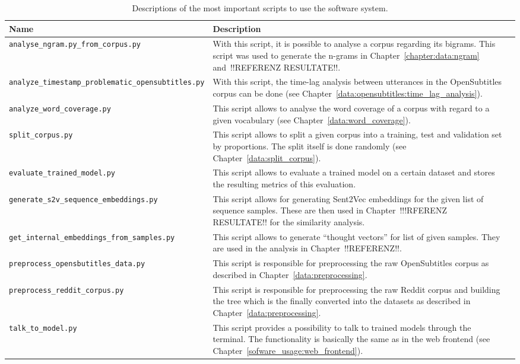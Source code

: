 \begin{table}[H]
	\centering
	\begin{adjustbox}{max width=\textwidth}
		\begin{tabular}{lp{8cm}p{8cm}}
			\toprule
			Name & Description\\ \midrule
			\texttt{analyse{\_}ngram.py{\_}from{\_}corpus.py} & With this script, it is possible to analyse a corpus regarding its bigrams. This script was used to generate the n-grams in Chapter~\ref{chapter:data:ngram} and~!!REFERENZ RESULTATE!!.\\
			\texttt{analyze{\_}timestamp{\_}problematic{\_}opensubtitles.py} & With this script, the time-lag analysis between utterances in the OpenSubtitles corpus can be done (see Chapter~\ref{data:opensubtitles:time_lag_analysis}).\\
			\texttt{analyze{\_}word{\_}coverage.py} & This script allows to analyse the word coverage of a corpus with regard to a given vocabulary (see Chapter~\ref{data:word_coverage}).\\
			\texttt{split{\_}corpus.py} & This script allows to split a given corpus into a training, test and validation set by proportions. The split itself is done randomly (see Chapter~\ref{data:split_corpus}).\\
			\texttt{evaluate{\_}trained{\_}model.py} & This script allows to evaluate a trained model on a certain dataset and stores the resulting metrics of this evaluation.\\
			\texttt{generate{\_}s2v{\_}sequence{\_}embeddings.py} & This script allows for generating Sent2Vec embeddings for the given list of sequence samples. These are then used in Chapter~!!!RFERENZ RESULTATE!! for the similarity analysis.\\
			\texttt{get{\_}internal{\_}embeddings{\_}from{\_}samples.py} & This script allows to generate ``thought vectors'' for list of given samples. They are used in the analysis in Chapter~!!REFERENZ!!.\\
			\texttt{preprocess{\_}opensbutitles{\_}data.py} & This script is responsible for preprocessing the raw OpenSubtitles corpus as described in Chapter~\ref{data:preprocessing}.\\
			\texttt{preprocess{\_}reddit{\_}corpus.py} & This script is responsible for preprocessing the raw Reddit corpus and building the tree which is the finally converted into the datasets as described in Chapter~\ref{data:preprocessing}.\\
			\texttt{talk{\_}to{\_}model.py} & This script provides a possibility to talk to trained models through the terminal. The functionality is basically the same as in the web frontend (see Chapter~\ref{sofware_usage:web_frontend}).\\
			\bottomrule
		\end{tabular}
	\end{adjustbox}
	\caption{Descriptions of the most important scripts to use the software system.}
\end{table}

